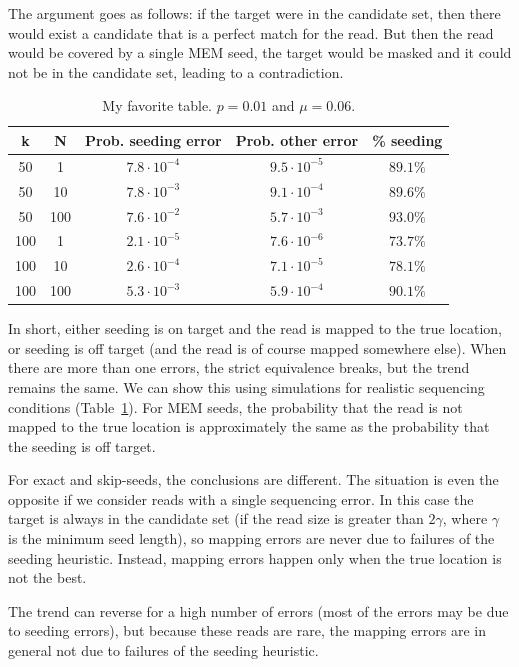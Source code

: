 \documentclass{article}
\begin{document}
The argument goes as follows: if the target were in the candidate set,
then there would exist a candidate that is a perfect match for the read.
But then the read would be covered by a single MEM seed, the target would
be masked and it could not be in the candidate set, leading to a
contradiction.

\begin{table}
\renewcommand{\arraystretch}{1.1}
\centering
\begin{tabular}{ccccc}
k & N & Prob. seeding error & Prob. other error & \% seeding \\
\hline
50  &  1  & $7.8 \cdot 10^{-4}$ & $9.5 \cdot 10^{-5}$ & $89.1\%$ \\
50  & 10  & $7.8 \cdot 10^{-3}$ & $9.1 \cdot 10^{-4}$ & $89.6\%$ \\
50  & 100 & $7.6 \cdot 10^{-2}$ & $5.7 \cdot 10^{-3}$ & $93.0\%$ \\
100 &  1  & $2.1 \cdot 10^{-5}$ & $7.6 \cdot 10^{-6}$ & $73.7\%$ \\
100 & 10  & $2.6 \cdot 10^{-4}$ & $7.1 \cdot 10^{-5}$ & $78.1\%$ \\
100 & 100 & $5.3 \cdot 10^{-3}$ & $5.9 \cdot 10^{-4}$ & $90.1\%$
\end{tabular}
\caption{My favorite table. $p = 0.01$ and $\mu = 0.06$.}
\label{table_mem}
\end{table}

In short, either seeding is on target and the read is mapped to the true
location, or seeding is off target (and the read is of course mapped
somewhere else). When there are more than one errors, the strict
equivalence breaks, but the trend remains the same. We can show this
using simulations for realistic sequencing conditions
(Table~\ref{table_mem}). For MEM seeds, the probability that the read is
not mapped to the true location is approximately the same as the
probability that the seeding is off target.

For exact and skip-seeds, the conclusions are different. The situation is
even the opposite if we consider reads with a single sequencing error. In
this case the target is always in the candidate set (if the read size is
greater than $2\gamma$, where $\gamma$ is the minimum seed length), so
mapping errors are never due to failures of the seeding heuristic.
Instead, mapping errors happen only when the true location is not the
best.

The trend can reverse for a high number of errors (most of the errors may
be due to seeding errors), but because these reads are rare, the mapping
errors are in general not due to failures of the seeding heuristic.
\end{document}
